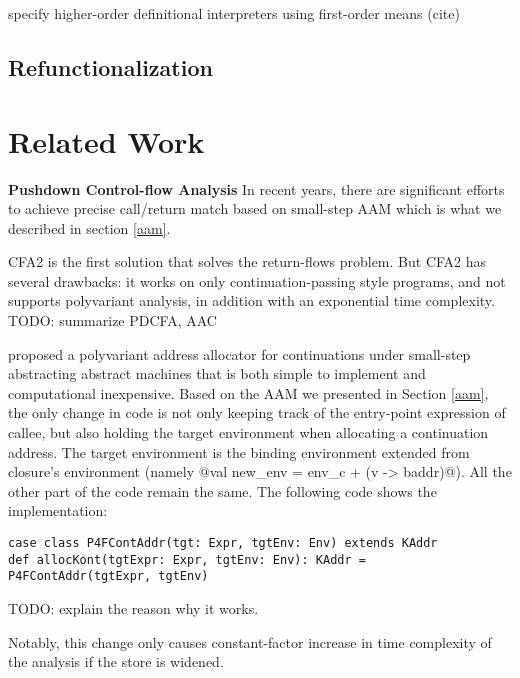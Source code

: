 \documentclass[acmsmall,review,anonymous]{acmart}\settopmatter{printfolios=true,printccs=false,printacmref=false}
\begin{document}
specify higher-order definitional interpreters using first-order means (cite)

\subsection{Refunctionalization}


\section{Related Work}

\textbf{Pushdown Control-flow Analysis}
In recent years, there are significant efforts \cite{vardoulakis2010cfa2, earl2012introspective, 
gilray2016pushdown, johnson2015abstracting} to achieve precise call/return 
match based on small-step AAM which is what we described in section \ref{aam}.

CFA2 is the first solution that solves the return-flows problem\cite{vardoulakis2010cfa2}.
But CFA2 has several drawbacks: it works on only continuation-passing style programs, 
and not supports polyvariant analysis, in addition with an exponential time complexity.
TODO: summarize PDCFA, AAC

\citeauthor{gilray2016pushdown} proposed a polyvariant address allocator for continuations
under small-step abstracting abstract machines that is both simple to implement and
computational inexpensive. 
Based on the AAM we presented in Section \ref{aam}, the only change in code is
not only keeping track of the entry-point expression of callee, but also holding the target environment
when allocating a continuation address.
The target environment is the binding environment extended from closure's environment
(namely @val new_env = env_c + (v -> baddr)@). All the other part of the code remain the same.
The following code shows the implementation:

\begin{lstlisting}
case class P4FContAddr(tgt: Expr, tgtEnv: Env) extends KAddr
def allocKont(tgtExpr: Expr, tgtEnv: Env): KAddr = P4FContAddr(tgtExpr, tgtEnv)
\end{lstlisting}

TODO: explain the reason why it works.

Notably, this change only causes constant-factor increase in time complexity of 
the analysis if the store is widened.
\end{document}
